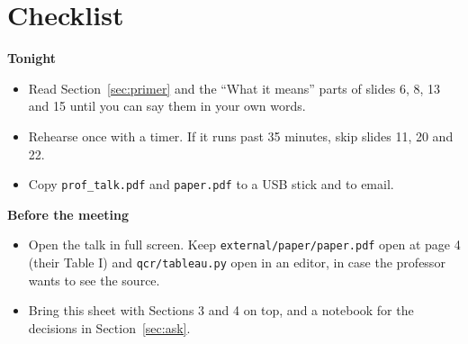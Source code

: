 \documentclass[11pt,a4paper]{article}
\begin{document}
\section{Checklist}

\textbf{Tonight}
\begin{itemize}
  \item[$\square$] Read Section~\ref{sec:primer} and the ``What it means'' parts of slides 6, 8, 13 and 15 until you can say
        them in your own words.
  \item[$\square$] Rehearse once with a timer. If it runs past 35 minutes, skip slides 11, 20 and 22.
  \item[$\square$] Copy \texttt{prof\_talk.pdf} and \texttt{paper.pdf} to a USB stick and to email.
\end{itemize}
\textbf{Before the meeting}
\begin{itemize}
  \item[$\square$] Open the talk in full screen. Keep \texttt{external/paper/paper.pdf} open at page 4 (their Table I) and
        \texttt{qcr/tableau.py} open in an editor, in case the professor wants to see the source.
  \item[$\square$] Bring this sheet with Sections 3 and 4 on top, and a notebook for the decisions in Section~\ref{sec:ask}.
\end{itemize}
\end{document}
